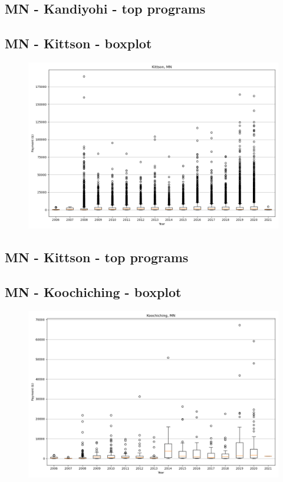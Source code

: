 \subsection*{MN - Kandiyohi - top programs}

\newpage
\subsection*{MN - Kittson - boxplot}
\begin{figure}[h]
\centering
\includegraphics[width=7in]{../output/boxplots/counties/Kittson-MN_boxplot.png}
\end{figure}


\subsection*{MN - Kittson - top programs}

\newpage
\subsection*{MN - Koochiching - boxplot}
\begin{figure}[h]
\centering
\includegraphics[width=7in]{../output/boxplots/counties/Koochiching-MN_boxplot.png}
\end{figure}


